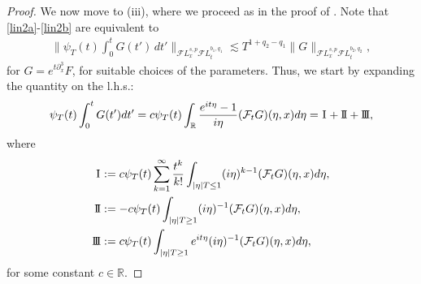 \documentclass[a4paper,
11pt,  reqno]{amsart}
\newcommand{\I}{\hspace{0.2mm}\textup{I}\hspace{0.2mm}}
\newcommand{\II}{\textup{I \hspace{-2.9mm} I} }
\newcommand{\III}{\textup{I \hspace{-2.9mm} I \hspace{-2.9mm} I}}
\newcommand{\5}{\textup{V}}
\newcommand{\FL}{\mathcal{F} L}
\newcommand{\les}{\lesssim}
\theoremstyle{remark}
\newcommand{\R}{\mathbb{R}}
\numberwithin{equation}{section}
\numberwithin{theorem}{section}
\begin{document}
\begin{proof}
			We now move to (iii), where we proceed as in the proof of \cite[Lemma~2]{Grunrock_mkdv}.
            Note that \eqref{lin2a}-\eqref{lin2b} are equivalent to
            \begin{align}
                \bigg\| \psi_T (t) \int_0^t G(t') \, dt' \bigg\|_{\FL^{s, p}_x \FL^{b_1, q_1 }_t }
                \les T^{1+ q_2 - q_1} \| G \|_{\FL^{s, p}_x \FL^{b_2 , q_2}_t },
            \end{align}
            for $G = e^{t\partial_x^3} F$, for suitable choices of the parameters. Thus, we start by expanding the quantity on the l.h.s.:
			\begin{equation}
				\psi_T(t)\int_0^t G(t') dt' =  c \psi_T (t)\int_\R \frac{e^{it\eta}-1}{i\eta } (\mathcal{F}_t G )(\eta,x) d\eta = \I + \II + \III,
				\label{lin3a}
			\end{equation}
			where
			\begin{equation}
				\label{lin3}
				\begin{aligned}
					\I & :=c\psi_T(t)\sum_{k= 1}^\infty \frac{t^k}{k!}\int_{|\eta| T \le 1} (i\eta)^{k-1} (\mathcal{F}_t G )(\eta,x) d\eta, \\
					\II& :=-c\psi_T (t)\int_{|\eta|T \ge 1} (i\eta)^{-1} (\mathcal{F}_t G )(\eta,x) d\eta , \\
					\III & :=c\psi_T (t)\int_{|\eta| T  \ge 1} e^{it\eta}(i\eta)^{-1} (\mathcal{F}_t G )(\eta,x) d\eta,
				\end{aligned}
			\end{equation}
			for some constant $c\in\R$.




\end{proof}
\end{document}
